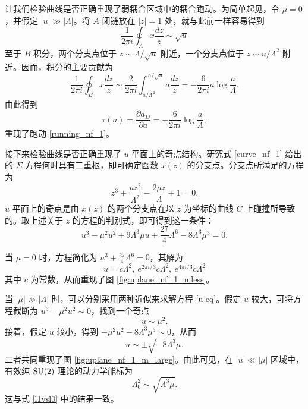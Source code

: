 让我们检验曲线是否正确重现了弱耦合区域中的耦合跑动。为简单起见，令 $\mu=0$，并假定 $|u|\gg|\Lambda|$。将 $A$ 闭链放在 $|z|=1$ 处，就与此前一样容易得到
\begin{equation}
\frac{1}{2\pi i}\oint_A x\frac{dz}z\sim\sqrt{u}
\end{equation}
至于 $B$ 积分，两个分支点位于 $z\sim\Lambda/\sqrt{u}$ 附近，一个分支点位于 $z\sim u/\Lambda^2$ 附近。因而，积分的主要贡献为
\begin{equation}
\frac{1}{2\pi i}\oint_B x\frac{dz}z\sim
\frac{2}{2\pi i}\int^{\Lambda/\sqrt{u}}_{u/\Lambda^2}a\frac{dz}z
=-\frac{6}{2\pi i}a\log\frac{a}{\Lambda}.
\end{equation}
由此得到
\begin{equation}
\tau(a)=\frac{\partial a_D}{\partial a}=-\frac{6}{2\pi i}\log\frac{a}{\Lambda},
\end{equation}
重现了跑动 \eqref{running_nf_1}。

接下来检验曲线是否正确重现了 $u$ 平面上的奇点结构。研究式 \eqref{curve_nf_1} 给出的 $\Sigma$ 方程何时具有二重根，即可确定函数 $x(z)$ 的分支点。分支点所满足的方程为
\begin{equation}
z^3+\frac{uz^2}{\Lambda^2}-\frac{2\mu z}{\Lambda}+1=0.
\end{equation}
$u$ 平面上的奇点是由 $x(z)$ 的两个分支点在以 $z$ 为坐标的\Gaiotto 曲线 $C$ 上碰撞所导致的。取上述关于 $z$ 的方程的判别式，即可得到这一条件：
\begin{equation}
u^3-\mu^2u^2+9\Lambda^3\mu u+\frac{27}{4}\Lambda^6-8\Lambda^3\mu^3=0.\label{u-eq}
\end{equation}

当 $\mu=0$ 时，方程简化为 $u^3+\frac{27}4\Lambda^6=0$，其解为
\begin{equation}
u=c\Lambda^2,\ e^{2\pi i/3}c\Lambda^2,\ e^{4\pi i/3}c\Lambda^2
\end{equation}
其中 $c$ 为常数，从而重现了图 \ref{fig:uplane_nf_1_mless}。

当 $|\mu|\gg|\Lambda|$ 时，可以分别采用两种近似来求解方程 \eqref{u-eq}。假定 $u$ 较大，可将方程截断为 $u^3-\mu^2u^2\sim0$，找到一个奇点
\begin{equation}
u\sim\mu^2.
\end{equation}
接着，假定 $u$ 较小，得到 $-\mu^2u^2-8\Lambda^3\mu^3\sim0$，从而
\begin{equation}
u\sim\pm\sqrt{-8\Lambda^3\mu}.\label{asd}
\end{equation}
二者共同重现了图 \ref{fig:uplane_nf_1_m_large}。由此可见，在 $|u|\ll|\mu|$ 区域中，有效纯 $\mathop{\mathrm{SU}}(2)$ 理论的动力学能标为
\begin{equation}
\Lambda_0^2\sim\sqrt{\Lambda^3\mu}.\label{relation01}
\end{equation}
这与式 \eqref{l1vsl0} 中的结果一致。

